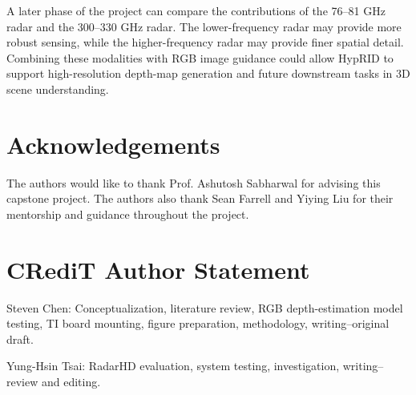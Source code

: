 \documentclass[conference]{IEEEtran}
\begin{document}
A later phase of the project can compare the contributions of the 76--81 GHz radar and the 300--330 GHz radar. The lower-frequency radar may provide more robust sensing, while the higher-frequency radar may provide finer spatial detail. Combining these modalities with RGB image guidance could allow HypRID to support high-resolution depth-map generation and future downstream tasks in 3D scene understanding.

\section*{Acknowledgements}

The authors would like to thank Prof. Ashutosh Sabharwal for advising this capstone project. The authors also thank Sean Farrell and Yiying Liu for their mentorship and guidance throughout the project.

\section*{CRediT Author Statement}

Steven Chen: Conceptualization, literature review, RGB depth-estimation model testing, TI board mounting, figure preparation, methodology, writing--original draft.

Yung-Hsin Tsai: RadarHD evaluation, system testing, investigation, writing--review and editing.



\end{document}
